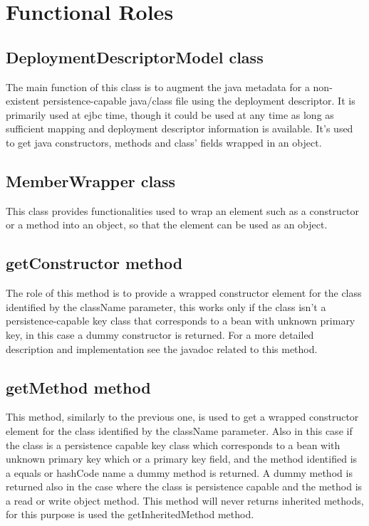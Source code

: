 \section{Functional Roles}
\subsection{DeploymentDescriptorModel class}
The main function of this class is to augment the java metadata for a non-existent persistence-capable java/class file using the deployment descriptor. It is primarily used at ejbc time, though it could be used at any time as long as sufficient mapping and deployment descriptor information is available. It's used to get java constructors, methods and class' fields wrapped in an object.

\subsection{MemberWrapper class}
This class provides functionalities used to wrap an element such as a constructor or a method into an object, so that the element can be used as an object.

\subsection{getConstructor method}
The role of this method is to provide a wrapped constructor element for the class identified by the className parameter, this works only if the class isn't a persistence-capable key class that corresponds to a bean with unknown primary key, in this case a dummy constructor is returned. For a more detailed description and implementation see the javadoc related to this method.

\subsection{getMethod method}
This method, similarly to the previous one, is used to get a wrapped constructor element for the class identified by the className parameter. Also in this case if the class is a persistence capable key class which corresponds to a bean with unknown primary key which or a primary key field, and the method identified is a equals or hashCode name a dummy method is returned. A dummy method is returned also in the case where the class is persistence capable and the method is a read or write object method. This method will never returns inherited methods, for this purpose is used the getInheritedMethod method.

